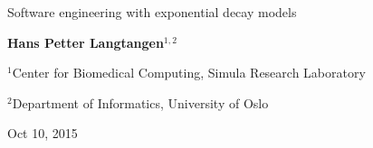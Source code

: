 \documentclass[%
oneside,                 %
final,                   %
10pt]{article}
\begin{document}







\thispagestyle{empty}

\begin{center}
{\LARGE\bf
\begin{spacing}{1.25}
Software engineering with exponential decay models
\end{spacing}
}
\end{center}


\begin{center}
{\bf Hans Petter Langtangen${}^{1, 2}$} \\ [0mm]
\end{center}

\begin{center}
\centerline{{\small ${}^1$Center for Biomedical Computing, Simula Research Laboratory}}
\centerline{{\small ${}^2$Department of Informatics, University of Oslo}}
\end{center}
    

\begin{center}
Oct 10, 2015
\end{center}

\vspace{1cm}


\tableofcontents

\clearpage %
\end{document}
